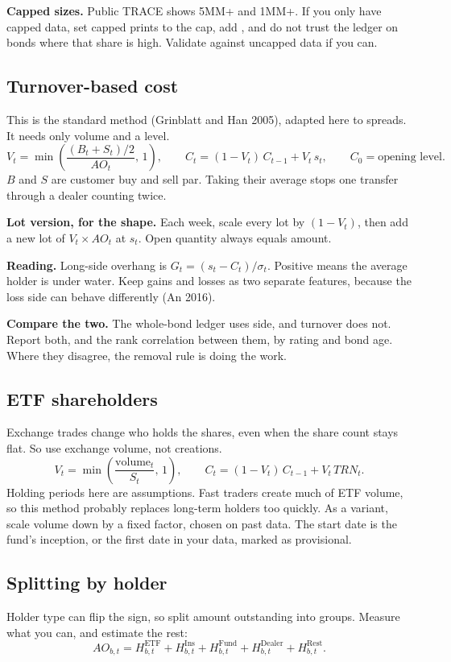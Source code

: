 \documentclass[11pt]{article}
\newcommand{\code}[1]{\texttt{\detokenize{#1}}}
\begin{document}
\textbf{Capped sizes.} Public TRACE shows 5MM+ and 1MM+. If you only have capped data, set capped prints to the cap, add \code{capped_share}, and do not trust the ledger on bonds where that share is high. Validate against uncapped data if you can.

\subsection{Turnover-based cost}\label{sec:turnover}
This is the standard method (Grinblatt and Han 2005), adapted here to spreads. It needs only volume and a level.
\[
V_t = \min\left(\frac{(B_t + S_t)/2}{AO_t},\, 1\right), \qquad
C_t = (1 - V_t)\, C_{t-1} + V_t\, s_t, \qquad C_0 = \text{opening level.}
\]
$B$ and $S$ are customer buy and sell par. Taking their average stops one transfer through a dealer counting twice.

\textbf{Lot version, for the shape.} Each week, scale every lot by $(1 - V_t)$, then add a new lot of $V_t \times AO_t$ at $s_t$. Open quantity always equals amount.

\textbf{Reading.} Long-side overhang is $G_t = (s_t - C_t)/\sigma_t$. Positive means the average holder is under water. Keep gains and losses as two separate features, because the loss side can behave differently (An 2016).

\textbf{Compare the two.} The whole-bond ledger uses side, and turnover does not. Report both, and the rank correlation between them, by rating and bond age. Where they disagree, the removal rule is doing the work.

\subsection{ETF shareholders}
Exchange trades change who holds the shares, even when the share count stays flat. So use exchange volume, not creations.
\[
V_t = \min\left(\frac{\mathrm{volume}_t}{S_t},\, 1\right), \qquad C_t = (1 - V_t)\, C_{t-1} + V_t\, TRN_t .
\]
Holding periods here are assumptions. Fast traders create much of ETF volume, so this method probably replaces long-term holders too quickly. As a variant, scale volume down by a fixed factor, chosen on past data. The start date is the fund's inception, or the first date in your data, marked as provisional.

\subsection{Splitting by holder}\label{sec:stack}
Holder type can flip the sign, so split amount outstanding into groups. Measure what you can, and estimate the rest:
\[
AO_{b,t} = H^{\mathrm{ETF}}_{b,t} + H^{\mathrm{Ins}}_{b,t} + H^{\mathrm{Fund}}_{b,t} + H^{\mathrm{Dealer}}_{b,t} + H^{\mathrm{Rest}}_{b,t}.
\]
\end{document}
